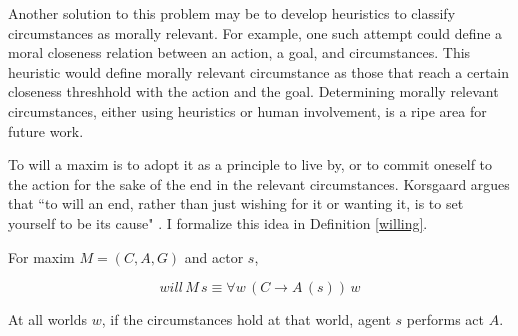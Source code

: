 \begin{isabellebody}
\begin{isamarkuptext}
Another solution to this problem may be to develop heuristics to classify circumstances as morally 
relevant. For example, one such attempt could define a moral closeness relation between an action, a 
goal, and circumstances. This heuristic would define morally relevant circumstance as those that 
reach a certain closeness threshhold with the action and the goal. Determining morally relevant
circumstances, either using heuristics or human involvement, is a ripe area for future work.
\color{black}

To will a maxim is to adopt it as a principle to live by, or to commit oneself to the action for the 
sake of the end in the relevant circumstances. Korsgaard argues that ``to will an end, rather than 
just wishing for it or wanting it, is to set yourself to be its cause" \cite[38]{sources}. I formalize
this idea in Definition \ref{willing}.

\begin{definition}[Willing]\label{willing}
For maxim $M = (C, A, G)$ and actor $s$,

$$will \, M \, s \equiv \forall w \, (C \longrightarrow A \, (s)) \, w$$

At all worlds $w$, if the circumstances hold at that world, agent $s$ performs act $A$.

\end{definition}


\end{isamarkuptext}
\end{isabellebody}
